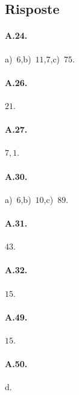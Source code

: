 \newpage
\subsection{Risposte}
\begin{multicols}{2}
 \paragraph{A.24.}
a)~$6$,\quad b)~$11$,$7$,\quad c)~$75$.

\paragraph{A.26.} $21$.

\paragraph{A.27.} $7,1$.

\paragraph{A.30.}
a)~$6$,\quad b)~$10$,\quad c)~$89$.

\paragraph{A.31.} $43$.

\paragraph{A.32.} $15$.

\paragraph{A.49.} $15$.

\paragraph{A.50.} d.
\end{multicols}

